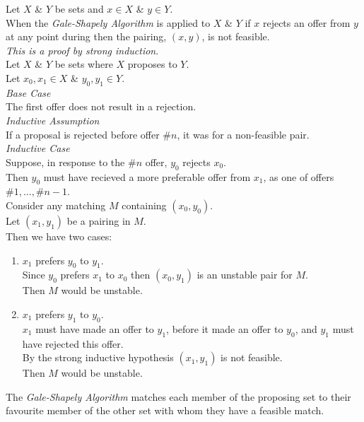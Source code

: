 \documentclass[11pt,a4paper]{article}
\begin{document}
Let $X$ \& $Y$ be sets and $x\in X$ \& $y\in Y$.\\
When the \textit{Gale-Shapely Algorithm} is applied to $X$ \& $Y$ if $x$ rejects an offer from $y$ at any point during then the pairing, $(x,y)$, is not feasible.\\

\textit{This is a proof by strong induction}.\\
Let $X$ \& $Y$ be sets where $X$ proposes to $Y$.\\
Let $x_0, x_1\in X$ \& $y_0, y_1\in Y$.\\
\textit{Base Case}\\
The first offer does not result in a rejection.\\
\textit{Inductive Assumption}\\
If a proposal is rejected before offer $\#n$, it was for a non-feasible pair.\\
\textit{Inductive Case}\\
Suppose, in response to the $\#n$ offer, $y_0$ rejects $x_0$.\\
Then $y_0$ must have recieved a more preferable offer from $x_1$, as one of offers $\#1, \dots, \#n-1$.\\
Consider any matching $M$ containing $(x_0, y_0)$.\\
Let $(x_1,y_1)$ be a pairing in $M$.\\
Then we have two cases:
\begin{enumerate}[label=Case \arabic* -]
  \item $x_1$ prefers $y_0$ to $y_1$.\\
        Since $y_0$ prefers $x_1$ to $x_0$ then $(x_0, y_1)$ is an unstable pair for $M$.\\
        Then $M$ would be unstable.
  \item $x_1$ prefers $y_1$ to $y_0$.\\
        $x_1$ must have made an offer to $y_1$, before it made an offer to $y_0$, and $y_1$ must have rejected this offer.\\
        By the strong inductive hypothesis $(x_1, y_1)$ is not feasible.\\
Then $M$ would be unstable.\\
\end{enumerate}

The \textit{Gale-Shapely Algorithm} matches each member of the proposing set to their favourite member of the other set with whom they have a feasible match.\\
\end{document}
